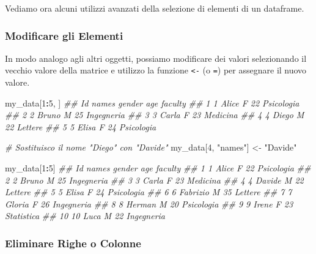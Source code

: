 \documentclass[
]{book}
\newenvironment{Shaded}{\begin{snugshade}}{\end{snugshade}}
\newcommand{\CommentTok}[1]{\textcolor[rgb]{0.56,0.35,0.01}{\textit{#1}}}
\newcommand{\DecValTok}[1]{\textcolor[rgb]{0.00,0.00,0.81}{#1}}
\newcommand{\NormalTok}[1]{#1}
\newcommand{\OperatorTok}[1]{\textcolor[rgb]{0.81,0.36,0.00}{\textbf{#1}}}
\newcommand{\StringTok}[1]{\textcolor[rgb]{0.31,0.60,0.02}{#1}}
\begin{document}
Vediamo ora alcuni utilizzi avanzati della selezione di elementi di un dataframe.

\hypertarget{modificare-gli-elementi-2}{%
\subsubsection*{Modificare gli Elementi}\label{modificare-gli-elementi-2}}

In modo analogo agli altri oggetti, possiamo modificare dei valori selezionando il vecchio valore della matrice e utilizzo la funzione \texttt{\textless{}-} (o \texttt{=}) per assegnare il nuovo valore.

\begin{Shaded}
\begin{Highlighting}[]
\NormalTok{my_data[}\DecValTok{1}\OperatorTok{:}\DecValTok{5}\NormalTok{, ]}
\CommentTok{##   Id names gender age    faculty}
\CommentTok{## 1  1 Alice      F  22 Psicologia}
\CommentTok{## 2  2 Bruno      M  25 Ingegneria}
\CommentTok{## 3  3 Carla      F  23   Medicina}
\CommentTok{## 4  4 Diego      M  22    Lettere}
\CommentTok{## 5  5 Elisa      F  24 Psicologia}

\CommentTok{# Sostituisco il nome "Diego" con "Davide"}
\NormalTok{my_data[}\DecValTok{4}\NormalTok{, }\StringTok{"names"}\NormalTok{] <-}\StringTok{ "Davide"}

\NormalTok{my_data[}\DecValTok{1}\OperatorTok{:}\DecValTok{5}\NormalTok{]}
\CommentTok{##    Id    names gender age    faculty}
\CommentTok{## 1   1    Alice      F  22 Psicologia}
\CommentTok{## 2   2    Bruno      M  25 Ingegneria}
\CommentTok{## 3   3    Carla      F  23   Medicina}
\CommentTok{## 4   4   Davide      M  22    Lettere}
\CommentTok{## 5   5    Elisa      F  24 Psicologia}
\CommentTok{## 6   6 Fabrizio      M  35    Lettere}
\CommentTok{## 7   7   Gloria      F  26 Ingegneria}
\CommentTok{## 8   8   Herman      M  20 Psicologia}
\CommentTok{## 9   9    Irene      F  23 Statistica}
\CommentTok{## 10 10     Luca      M  22 Ingegneria}
\end{Highlighting}
\end{Shaded}

\hypertarget{eliminare-righe-o-colonne-1}{%
\subsubsection*{Eliminare Righe o Colonne}\label{eliminare-righe-o-colonne-1}}
\end{document}
